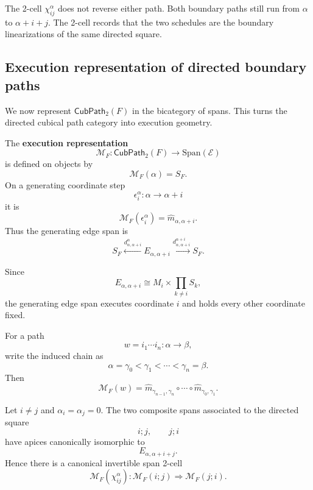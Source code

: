 \begin{remark}
\label{rem:cmett-direction-retained}
    The 2-cell \(\chi_{ij}^{\alpha}\) does not reverse either path. Both
    boundary paths still run from \(\alpha\) to \(\alpha+i+j\). The 2-cell
    records that the two schedules are the boundary linearizations of the
    same directed square.
\end{remark}

\subsection{Execution representation of directed boundary paths}
\label{subsec:cmett-execution-representation-directed-boundary-paths}

We now represent \(\mathsf{CubPath}_2(F)\) in the bicategory of spans. This
turns the directed cubical path category into execution geometry.

\begin{definition}
\label{def:cmett-execution-representation-directed-cube}
    The \textbf{execution representation}
    \[
        \mathcal M_F:\mathsf{CubPath}_2(F)\to\mathrm{Span}(\mathcal E)
    \]
    is defined on objects by
    \[
        \mathcal M_F(\alpha)=S_F.
    \]
    On a generating coordinate step
    \[
        \epsilon_i^\alpha:\alpha\to\alpha+i
    \]
    it is
    \[
        \mathcal M_F(\epsilon_i^\alpha)
        =
        \widehat m_{\alpha,\alpha+i}.
    \]
    Thus the generating edge span is
    \[
        S_F
        \xleftarrow{d_{\alpha,\alpha+i}^{\alpha}}
        E_{\alpha,\alpha+i}
        \xrightarrow{d_{\alpha,\alpha+i}^{\alpha+i}}
        S_F.
    \]
\end{definition}

Since
\[
    E_{\alpha,\alpha+i}
    \cong
    M_i\times\prod_{k\neq i}S_k,
\]
the generating edge span executes coordinate \(i\) and holds every other
coordinate fixed.

For a path
\[
    w=i_1\cdots i_n:\alpha\to\beta,
\]
write the induced chain as
\[
    \alpha=\gamma_0<\gamma_1<\cdots<\gamma_n=\beta.
\]
Then
\[
    \mathcal M_F(w)
    =
    \widehat m_{\gamma_{n-1},\gamma_n}
    \circ\cdots\circ
    \widehat m_{\gamma_0,\gamma_1}.
\]

\begin{lemma}
\label{lem:cmett-image-elementary-square}
    Let \(i\neq j\) and \(\alpha_i=\alpha_j=0\). The two composite spans
    associated to the directed square
    \[
        i;j,
        \qquad
        j;i
    \]
    have apices canonically isomorphic to
    \[
        E_{\alpha,\alpha+i+j}.
    \]
    Hence there is a canonical invertible span 2-cell
    \[
        \mathcal M_F(\chi_{ij}^{\alpha}):
        \mathcal M_F(i;j)\Longrightarrow \mathcal M_F(j;i).
    \]
\end{lemma}

